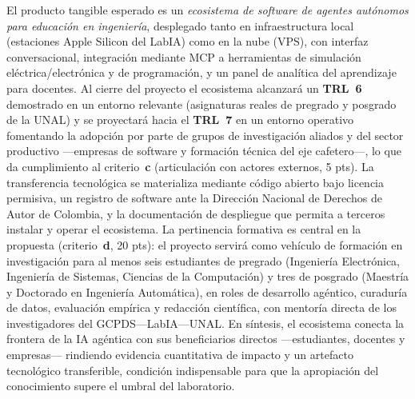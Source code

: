 El producto tangible esperado es un \emph{ecosistema de software de agentes autónomos para educación en ingeniería}, desplegado tanto en infraestructura local (estaciones Apple Silicon del LabIA) como en la nube (VPS), con interfaz conversacional, integración mediante MCP a herramientas de simulación eléctrica/electrónica y de programación, y un panel de analítica del aprendizaje para docentes. Al cierre del proyecto el ecosistema alcanzará un \textbf{TRL~6} demostrado en un entorno relevante (asignaturas reales de pregrado y posgrado de la UNAL) y se proyectará hacia el \textbf{TRL~7} en un entorno operativo fomentando la adopción por parte de grupos de investigación aliados y del sector productivo —empresas de software y formación técnica del eje cafetero—, lo que da cumplimiento al criterio~\textbf{c} (articulación con actores externos, 5 pts). La transferencia tecnológica se materializa mediante código abierto bajo licencia permisiva, un registro de software ante la Dirección Nacional de Derechos de Autor de Colombia, y la documentación de despliegue que permita a terceros instalar y operar el ecosistema. La pertinencia formativa es central en la propuesta (criterio~\textbf{d}, 20 pts): el proyecto servirá como vehículo de formación en investigación para al menos seis estudiantes de pregrado (Ingeniería Electrónica, Ingeniería de Sistemas, Ciencias de la Computación) y tres de posgrado (Maestría y Doctorado en Ingeniería Automática), en roles de desarrollo agéntico, curaduría de datos, evaluación empírica y redacción científica, con mentoría directa de los investigadores del GCPDS—LabIA—UNAL. En síntesis, el ecosistema conecta la frontera de la IA agéntica con sus beneficiarios directos —estudiantes, docentes y empresas— rindiendo evidencia cuantitativa de impacto y un artefacto tecnológico transferible, condición indispensable para que la apropiación del conocimiento supere el umbral del laboratorio.